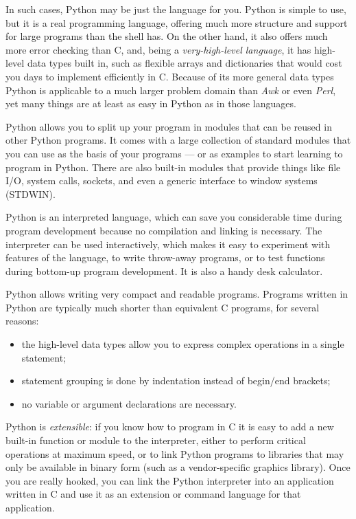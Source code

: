 In such cases, Python may be just the language for you.  Python is
simple to use, but it is a real programming language, offering much
more structure and support for large programs than the shell has.  On
the other hand, it also offers much more error checking than C, and,
being a {\em very-high-level language}, it has high-level data types
built in, such as flexible arrays and dictionaries that would cost you
days to implement efficiently in C.  Because of its more general data
types Python is applicable to a much larger problem domain than {\em
Awk} or even {\em Perl}, yet many things are at least as easy in
Python as in those languages.

Python allows you to split up your program in modules that can be
reused in other Python programs.  It comes with a large collection of
standard modules that you can use as the basis of your programs --- or
as examples to start learning to program in Python.  There are also
built-in modules that provide things like file I/O, system calls,
sockets, and even a generic interface to window systems (STDWIN).

Python is an interpreted language, which can save you considerable time
during program development because no compilation and linking is
necessary.  The interpreter can be used interactively, which makes it
easy to experiment with features of the language, to write throw-away
programs, or to test functions during bottom-up program development.
It is also a handy desk calculator.

Python allows writing very compact and readable programs.  Programs
written in Python are typically much shorter than equivalent C
programs, for several reasons:
\begin{itemize}
\item
the high-level data types allow you to express complex operations in a
single statement;
\item
statement grouping is done by indentation instead of begin/end
brackets;
\item
no variable or argument declarations are necessary.
\end{itemize}

Python is {\em extensible}: if you know how to program in C it is easy
to add a new built-in
function or
module to the interpreter, either to
perform critical operations at maximum speed, or to link Python
programs to libraries that may only be available in binary form (such
as a vendor-specific graphics library).  Once you are really hooked,
you can link the Python interpreter into an application written in C
and use it as an extension or command language for that application.

